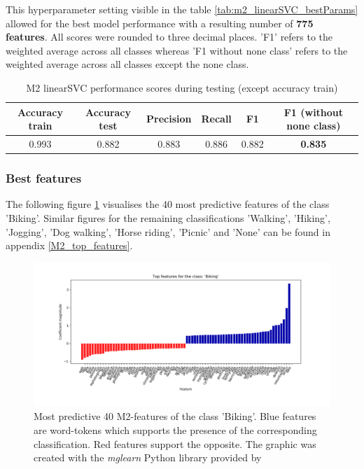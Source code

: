 This hyperparameter setting visible in the table \ref{tab:m2_linearSVC_bestParams} allowed for the best model performance with a resulting number of \textbf{775 features}. All scores were rounded to three decimal places. 'F1' refers to the weighted average across all classes whereas 'F1 without none class' refers to the weighted average across all classes except the none class.

\begin{table}[h!]
\begin{center}
\caption{M2 linearSVC performance scores during testing (except accuracy train)}\vspace{1ex}
\label{tab:m2_linearSVC_bestscores}
\begin{tabular}{cccccc}\hline
Accuracy train & Accuracy test & Precision & Recall & F1 & F1 (without none class)\\ \hline
0.993 & 0.882 & 0.883 & 0.886 & 0.882 & \textbf{0.835} \\ \hline
\end{tabular}
\end{center}
\end{table}

\subsubsection{Best features}
The following figure \ref{fig:M2_top40_features_biking} visualises the 40 most predictive features of the class 'Biking'. Similar figures for the remaining classifications 'Walking', 'Hiking', 'Jogging', 'Dog walking', 'Horse riding', 'Picnic' and 'None' can be found in appendix \ref{M2_top_features}. 
\begin{figure}[h!]
   \centering
   \includegraphics[width=\textwidth]{img/m2_top_40_features_Biking_cropped.pdf}
   \caption{Most predictive 40 M2-features of the class 'Biking'. Blue features are word-tokens which supports the presence of the corresponding classification. Red features support the opposite. The graphic was created with the \textit{mglearn} Python library provided by \parencite{Guido2016}}
   \label{fig:M2_top40_features_biking}
\end{figure}

